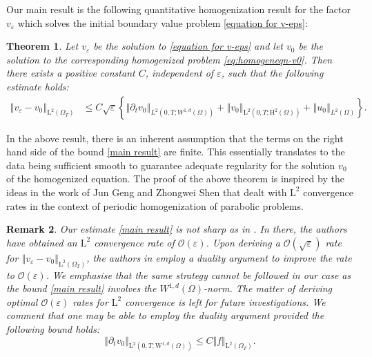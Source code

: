 \documentclass[preprint, 12pt]{amsart}
\numberwithin{equation}{section}
\newtheorem{theorem}{Theorem}[section]
\newtheorem{remark}[theorem]{Remark}        %
\numberwithin{equation}{section}
\newcommand{\eps}{\varepsilon}
\begin{document}
Our main result is the following quantitative homogenization result for the factor $v_\eps$ which solves the initial boundary value problem \eqref{equation for v-eps}:
\begin{theorem}\label{thm:main-result}
Let $v_{\eps}$ be the solution to \eqref{equation for v-eps} and let $v_0$ be the solution to the corresponding homogenized problem \eqref{eq:homogeneqn-v0}. Then there exists a positive constant $C$, independent of $\varepsilon$, such that the following estimate holds:
\begin{equation}\label{main result}
\begin{aligned}
\left \Vert v_\eps - v_0 \right\Vert_{\mathrm L^2(\Omega_T)} 
&  \le C \sqrt{\eps} \left\{ \left\Vert \partial_tv_0\right\Vert_{L^2(0,T;W^{1,d}(\Omega))} + \left\Vert v_0\right\Vert_{\mathrm L^2(0,T;\mathrm H^2(\Omega))} + \left\Vert u_0\right\Vert_{L^2(\Omega)} \right\}.
\end{aligned}
\end{equation}
\end{theorem}
In the above result, there is an inherent assumption that the terms on the right hand side of the bound \eqref{main result} are finite. This essentially translates to the data being sufficient smooth to guarantee adequate regularity for the solution $v_0$ of the homogenized equation. The proof of the above theorem is inspired by the ideas in the work of Jun Geng and Zhongwei Shen \cite{geng2017convergence} that dealt with $\mathrm L^2$ convergence rates in the context of periodic homogenization of parabolic problems. 
\begin{remark}\label{rem:duality-1}
Our estimate \eqref{main result} is not sharp as in \cite{geng2017convergence}. In there, the authors have obtained an $\mathrm L^2$ convergence rate of $\mathcal{O}(\eps)$. Upon deriving a $\mathcal{O}(\sqrt{\eps})$ rate for $\left\Vert v_\eps - v_0\right\Vert_{\mathrm L^2(\Omega_T)}$, the authors in \cite{geng2017convergence} employ a duality argument to improve the rate to $\mathcal{O}(\eps)$. We emphasise that the same strategy cannot be followed in our case as the bound \eqref{main result} involves the $W^{1,d}(\Omega)$-norm. The matter of deriving optimal $\mathcal{O}(\eps)$ rates for $\mathrm L^2$ convergence is left for future investigations. We comment that one may be able to employ the duality argument provided the following bound holds:
\[
\Vert \partial_t v_0 \Vert_{\mathrm L^2(0,T;\mathrm W^{1,d}(\Omega)) } \leq C \Vert f  \Vert_{\mathrm L^2( \Omega_T )}.
\]
\end{remark}
\end{document}
